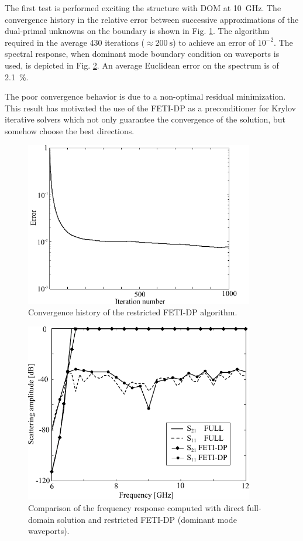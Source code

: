 The first test is performed exciting the structure with DOM at 10~GHz. The convergence history in the relative error between successive approximations of the dual-primal unknowns on the boundary is shown in Fig. \ref{fig:Convergence}. The algorithm required in the average 430 iterations ($\approx 200~\mathrm{s}$) to achieve an error of $10^{-2}$. The spectral response, when dominant mode boundary condition on waveports is used, is depicted in Fig. \ref{fig:WRfreqFETI}. An average Euclidean error on the spectrum is of 2.1~\%.

The poor convergence behavior is due to a non-optimal residual minimization. This result has motivated the use of the FETI-DP as a preconditioner for Krylov iterative solvers which not only guarantee the convergence of the solution, but somehow choose the best directions.


\begin{figure}[ht!]
\centering
\includegraphics[width=10cm]{Convergence}
\caption{Convergence history of the restricted FETI-DP algorithm.}
\label{fig:Convergence}
\end{figure}

\begin{figure}[h!]
\centering
\includegraphics[width=10cm]{WRfreqFETI}
\caption{Comparison of the frequency response computed with direct full-domain solution and restricted FETI-DP (dominant mode waveports).}
\label{fig:WRfreqFETI}
\end{figure}
\clearpage

